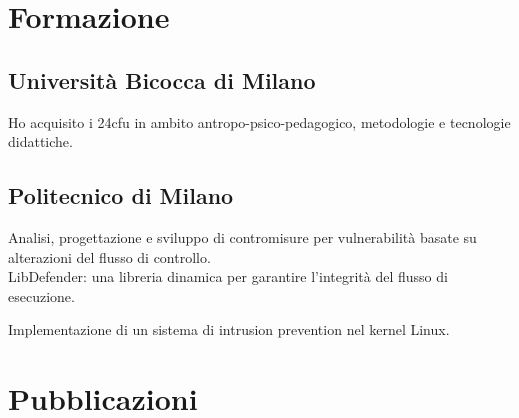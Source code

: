 \documentclass[]{deedy-resume-openfont}
\begin{document}
\newpage %
\begin{minipage}[t]{0.90\textwidth} %

\section{Formazione} 
\vspace*{4mm}
\subsection{Università Bicocca di Milano}

\vspace*{1mm}
Ho acquisito i 24cfu in ambito antropo-psico-pedagogico, metodologie e tecnologie didattiche.

\vspace*{4mm}
\subsection{Politecnico di Milano}

\vspace*{1mm}
Analisi, progettazione e sviluppo di contromisure per vulnerabilità basate su alterazioni del flusso di controllo.\\
LibDefender: una libreria dinamica per garantire l'integrità del flusso di esecuzione.

\vspace*{4mm}

\vspace*{1mm}
Implementazione di un sistema di intrusion prevention nel kernel Linux.
\vspace*{10mm}


\section{Pubblicazioni}
\vspace*{3mm}
\vspace*{1mm}
\vspace*{10mm}



\end{minipage}
\end{document}
